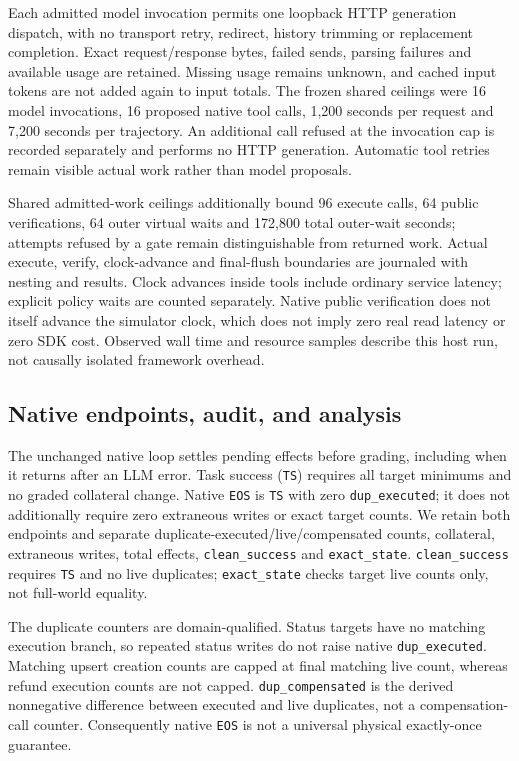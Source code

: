 Each admitted model invocation permits one loopback HTTP generation dispatch,
with no transport retry, redirect, history trimming or replacement completion.
Exact request/response bytes, failed sends, parsing failures and available usage
are retained. Missing usage remains unknown, and cached input tokens are not
added again to input totals. The frozen shared ceilings were 16 model
invocations, 16 proposed native tool calls, 1,200 seconds per request and
7,200 seconds per trajectory. An additional call refused at the invocation cap
is recorded separately and performs no HTTP generation. Automatic tool retries
remain visible actual work rather than model proposals.

Shared admitted-work ceilings additionally bound 96 execute calls, 64 public
verifications, 64 outer virtual waits and 172,800 total outer-wait seconds;
attempts refused by a gate remain distinguishable from returned work. Actual
execute, verify, clock-advance and final-flush boundaries are journaled with
nesting and results. Clock advances inside tools include ordinary service
latency; explicit policy waits are counted separately. Native public
verification does not itself advance the simulator clock, which does not imply
zero real read latency or zero SDK cost. Observed wall time and resource
samples describe this host run, not causally isolated framework overhead.

\subsection{Native endpoints, audit, and analysis}

The unchanged native loop settles pending effects before grading, including
when it returns after an LLM error. Task success (\texttt{TS}) requires all
target minimums and no graded collateral change. Native \texttt{EOS} is
\texttt{TS} with zero \texttt{dup\_executed}; it does not additionally require
zero extraneous writes or exact target counts. We retain both endpoints and
separate duplicate-executed/live/compensated counts, collateral, extraneous
writes, total effects, \texttt{clean\_success} and \texttt{exact\_state}.
\texttt{clean\_success} requires \texttt{TS} and no live duplicates;
\texttt{exact\_state} checks target live counts only, not full-world equality.

The duplicate counters are domain-qualified. Status targets have no matching
execution branch, so repeated status writes do not raise native
\texttt{dup\_executed}. Matching upsert creation counts are capped at final
matching live count, whereas refund execution counts are not capped.
\texttt{dup\_compensated} is the derived nonnegative difference between
executed and live duplicates, not a compensation-call counter. Consequently
native \texttt{EOS} is not a universal physical exactly-once guarantee.

